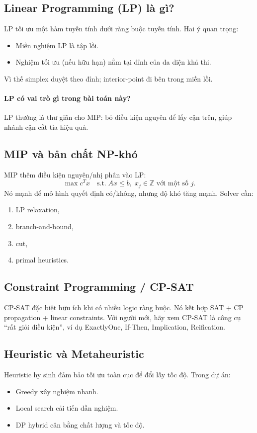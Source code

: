\documentclass[12pt,a4paper]{article}
\begin{document}
\subsection{Linear Programming (LP) là gì?}
LP tối ưu một hàm tuyến tính dưới ràng buộc tuyến tính. Hai ý quan trọng:
\begin{itemize}
  \item Miền nghiệm LP là tập lồi.
  \item Nghiệm tối ưu (nếu hữu hạn) nằm tại đỉnh của đa diện khả thi.
\end{itemize}
Vì thế simplex duyệt theo đỉnh; interior-point đi bên trong miền lồi.

\paragraph{LP có vai trò gì trong bài toán này?}
LP thường là thư giãn cho MIP: bỏ điều kiện nguyên để lấy cận trên, giúp nhánh-cận cắt tỉa hiệu quả.

\subsection{MIP và bản chất NP-khó}
MIP thêm điều kiện nguyên/nhị phân vào LP:
\begin{equation}
\max c^T x \quad \text{s.t.}\; Ax\le b,\; x_j \in \mathbb{Z} \text{ với một số } j.
\end{equation}
Nó mạnh để mô hình quyết định có/không, nhưng độ khó tăng mạnh. Solver cần:
\begin{enumerate}
  \item LP relaxation,
  \item branch-and-bound,
  \item cut,
  \item primal heuristics.
\end{enumerate}

\subsection{Constraint Programming / CP-SAT}
CP-SAT đặc biệt hữu ích khi có nhiều logic ràng buộc. Nó kết hợp SAT + CP propagation + linear constraints.
Với người mới, hãy xem CP-SAT là công cụ ``rất giỏi điều kiện'', ví dụ ExactlyOne, If-Then, Implication, Reification.

\subsection{Heuristic và Metaheuristic}
Heuristic hy sinh đảm bảo tối ưu toàn cục để đổi lấy tốc độ. Trong dự án:
\begin{itemize}
  \item Greedy xây nghiệm nhanh.
  \item Local search cải tiến dần nghiệm.
  \item DP hybrid cân bằng chất lượng và tốc độ.
\end{itemize}
\end{document}

